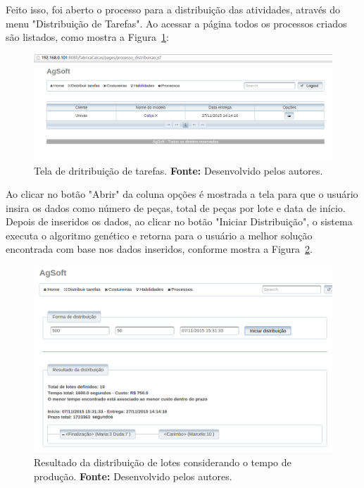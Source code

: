 \par Feito isso, foi aberto o processo para a distribuição
das atividades, através do menu "Distribuição de Tarefas".
Ao acessar a página todos os processos criados são
listados, como mostra a Figura~\ref{fig:distribuicao_tarefas}:

\begin{figure}[h!]
	\centerline{\includegraphics[width=14.7cm]{./imagens/tela_distribuicao_tarefas.png}}
	\caption[Tela de distribuição de tarefas.]
	{Tela de dritribuição de tarefas. \textbf{Fonte:} Desenvolvido
	pelos autores.}
	\label{fig:distribuicao_tarefas}
\end{figure}


\par Ao clicar no botão "Abrir" da coluna opções é mostrada a tela para que o
usuário insira os dados como número de peças, total de peças por lote e data de
início. Depois de inseridos os dados, ao clicar no botão "Iniciar Distribuição", o sistema executa
o algoritmo genético e retorna para o usuário a melhor solução
encontrada com base nos dados inseridos, conforme mostra a
Figura~\ref{fig:resultado_distribuicao_teste1}.

\begin{figure}[h!]
	\centerline{\includegraphics[width=14.7cm]{./imagens/resultado_distribuicao_teste1.png}}
	\caption[Resultado da distribuição de lotes considerando o tempo de produção.]
	{Resultado da distribuição de lotes considerando o tempo de produção. \textbf{Fonte:} Desenvolvido pelos
	autores.}
	\label{fig:resultado_distribuicao_teste1}
\end{figure}

